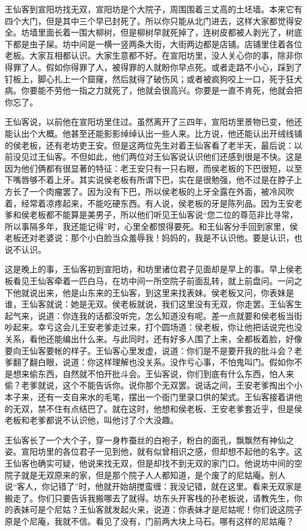 王仙客到宣阳坊找无双，宣阳坊是个大院子，周围围着三丈高的土坯墙。本来它有四个大门，但是其中三个早已封死了。所以你只能从北门进去，这样大家都觉得安全。坊墙里面长着一围大柳树，但是柳树早就死掉了，连树皮都被人剥光了，树底下都是虫子屎。坊中间是一横一竖两条大街，大街两边都是店铺。店铺里住着各位老板。大家互相都认识。大家生意都不好。在宣阳坊里，没人关心你的事，除非你得罪了人。假如你得罪了人，被得罪的人就盼你早点死。或者走路不小心，踩到了钉板上，脚心扎上一个窟窿，然后就得了破伤风；或者被疯狗咬上一口，死于狂犬病。你要能不劳他一指之力就死了，他就会很高兴。你要是一直不肯死，他就会把你忘了。 

王仙客说，以前他在宣阳坊里住过。虽然离开了三四年，宣阳坊里景物已变，他还能认出个大概。他甚至还能影影绰绰认出一些人来。比方说，他还能认出开绒线铺的侯老板，还有老坊吏王安。但是这两位先生对着王仙客看了老半天，最后说：以前没见过王仙客。不但如此，他们两位对王仙客说认识他们还感到很是不快。这是因为他们俩都有很显著的特征：老王安只有一只右眼，而侯老板的下巴很短，以至下嘴唇够不着上牙。其实说侯老板有所谓下巴，实在是很勉强，他不过是在脖子上方长了一个肉瘤罢了。因为没有下巴，所以侯老板的上牙全露在外面，被冷风吹着，经常着凉疼起来，不能吃硬东西。有人说，侯老板的牙是陈列品。因为王安老爹和侯老板都不能算是美男子，所以他们听见王仙客说“您二位的尊范非比寻常，所以事隔多年，我还能记得”时，心里全都恨得要死。和王仙客分手回到家里，侯老板还对老婆说：那个小白脸当众羞辱我！妈妈的，我是不认识他。要是认识，也说不认识。 

这是晚上的事，王仙客初到宣阳坊，和坊里诸位君子见面却是早上的事。早上侯老板看见王仙客牵着一匹白马，在坊中间一所空院子前面乱转，就上前盘问。一问之下他就说出来，他是山东来的王仙客，到这里来找表妹。侯老板又问，你表妹是谁，王仙客就说：她是无双。侯老板就说，我们这里没有无双，你走罢。王仙客生起气来，说道：你连我的话都没听完，怎么知道没有呢。差一点就要和侯老板当街吵起来。幸亏这会儿王安老爹走过来，打个圆场道：侯老板，你让他把话说完也没关系，看他还能编出什么来。与此同时，还有好多人围了上来，全都板着脸，好像要向王仙客要帐的样子。王仙客心里发虚，说道：你们是不是要开我的批斗会？老爹翻了翻白眼，说道：你这样理解也没关系。没作亏心事，不怕鬼叫门。假如你不是想来偷东西，自然就不怕开批斗会。王仙客说，你们到底有什么东西，怕人来偷？老爹就说，这个不能告诉你。说你那个无双罢。说话之间，王安老爹掏出个小本子来，还有一支自来水的毛笔，摆出一个衙门里录口供的架式。王仙客接着讲他的无双，禁不住有点结巴了。就在这时，他想和侯老板、王安老爹套近乎，但是侯老板和老爹都说不认识他，叫他讨了个大没趣。 

王仙客长了一个大个子，穿一身柞蚕丝的白袍子，粉白的面孔，飘飘然有神仙之姿。宣阳坊里的各位君子一见到他，就有似曾相识之感，但却想不起他的名字。这王仙客也确实可疑，他说来找无双，但是却找不到无双的家门口。他说坊中间的空院子就是无双原来的家，但是那个院子人人都知道，是个废了的尼姑庵。别人说“客人，你记错了”时，他就开始胡搅蛮缠：我没记错，就在这里。看来无双家是搬走了。你们只要告诉我搬哪去了就得。坊东头开客栈的孙老板说，请教先生，你的表妹可是个尼姑？王仙客就发起火来，说道：你表妹才是尼姑呢！你们说这院子原是个尼庵，我就不信。看见了没有，门前两大块上马石。哪有这样的尼姑庵？ 

